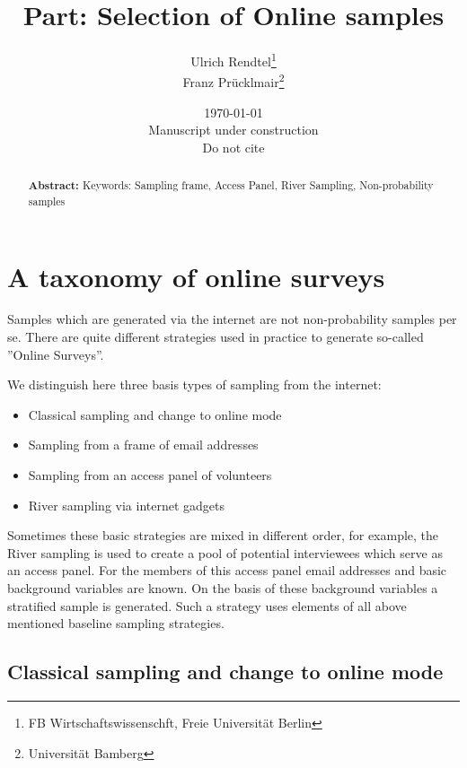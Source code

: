 \documentclass[a4paper , 11pt]{article}
\title{Part: Selection of Online samples}
\author{Ulrich Rendtel\thanks{FB Wirtschaftswissenschft, Freie Universität Berlin} \\ Franz Prücklmair\thanks{Universität Bamberg}
        }
\date{ \today\\Manuscript under construction\\ Do not cite}
\begin{document}
\maketitle
\tableofcontents

\begin{abstract}


\begin{center}
  \textbf{Abstract:} Keywords: Sampling frame, Access Panel, River Sampling, Non-probability samples
\end{center}



\end{abstract}



\newpage
\section{A taxonomy of online surveys}

Samples which are generated via the internet are not non-probability samples per se. There are quite different strategies used in practice to generate so-called ''Online Surveys''.

We distinguish here three basis types of sampling from the internet:
\begin{itemize}
  \item Classical sampling and change to online mode
  \item Sampling from a frame of email addresses
  \item Sampling from an access panel of volunteers
  \item River sampling via internet gadgets
\end{itemize}

Sometimes these basic strategies are mixed in different order, for example, the River sampling is used to create a pool of potential interviewees which serve as an access panel. For the members of this access panel email addresses and basic background variables are known. On the basis of these background variables a stratified sample is generated. Such a strategy uses elements of all above mentioned baseline sampling strategies.


\subsection{Classical sampling and change to online mode }
\end{document}
